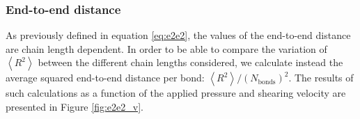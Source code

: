 \documentclass[aps,prb,reprint,superscriptaddress, a4paper]{revtex4-1}
\begin{document}


\subsubsection{End-to-end distance}

As previously defined in equation \ref{eq:e2e2}, the values of  the end-to-end distance are chain length dependent. In order to be able to compare the variation of $\left< R^2 \right> $ between the different chain lengths considered, we calculate instead the average squared end-to-end distance per bond: $\left< R^2 \right>/\left(N_\text{bonds}\right)^2$. The results of such calculations as a function of the applied pressure and shearing velocity are presented in Figure \ref{fig:e2e2_v}.
\end{document}
